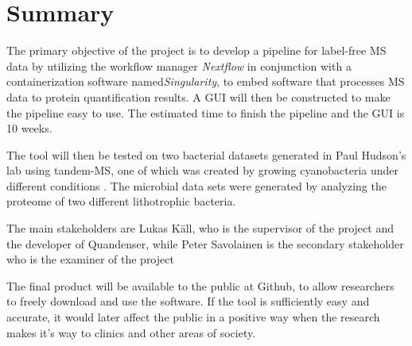 \section{Summary}

The primary objective of the project is to develop a pipeline for label-free MS data by utilizing the workflow manager \textit{Nextflow} in conjunction with a containerization software named\textit{Singularity}, to embed software that processes MS data to protein quantification results. A GUI will then be constructed to make the pipeline easy to use. The estimated time to finish the pipeline and the GUI is 10 weeks.

The tool will then be tested on two bacterial datasets generated in Paul Hudson’s lab using tandem-MS, one of which was created by growing cyanobacteria under different conditions \cite{michael}. The microbial data sets were generated by analyzing the proteome of two different lithotrophic bacteria.

The main stakeholders are Lukas Käll, who is the supervisor of the project and the developer of Quandenser, while Peter Savolainen is the secondary stakeholder who is the examiner of the project

The final product will be available to the public at Github, to allow researchers to freely download and use the software. If the tool is sufficiently easy and accurate, it would later affect the public in a positive way when the research makes it's way to clinics and other areas of society.
